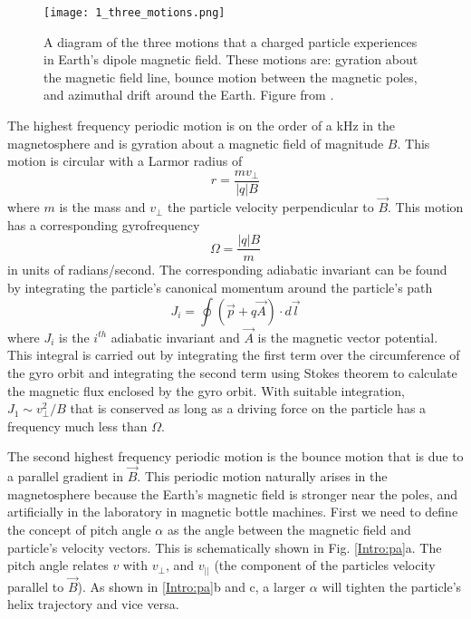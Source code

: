 \begin{figure}
\texttt{[image: 1\_three\_motions.png]}
\caption{A diagram of the three motions that a charged particle experiences in Earth's dipole magnetic field. These motions are: gyration about the magnetic field line, bounce motion between the magnetic poles, and azimuthal drift around the Earth. Figure from \citep{Baumjohann1997}.}
\label{Intro:motion_diagram}
\end{figure}


The highest frequency periodic motion is on the order of a kHz in the magnetosphere and is gyration about a magnetic field of magnitude $B$. This motion is circular with a Larmor radius of 
\begin{equation}
r = \frac{m v_\perp}{|q| B}
\end{equation} where $m$ is the mass and $v_\perp$ the particle velocity perpendicular to $\vec{B}$. This motion has a corresponding gyrofrequency 
\begin{equation}
\Omega = \frac{|q| B}{m}
\end{equation} in units of radians/second. The corresponding adiabatic invariant can be found by integrating the particle's canonical momentum around the particle's path
\begin{equation}
J_i = \oint (\vec{p} + q \vec{A}) \cdot d\vec{l}
\end{equation} where $J_i$ is the $i^{th}$ adiabatic invariant and $\vec{A}$ is the magnetic vector potential. This integral is carried out by integrating the first term over the circumference of the gyro orbit and integrating the second term using Stokes theorem to calculate the magnetic flux enclosed by the gyro orbit.  With suitable integration, $J_1 \sim v_\perp^2 / B$ that is conserved as long as a driving force on the particle has a frequency much less than $\Omega$.

The second highest frequency periodic motion is the bounce motion that is due to a parallel gradient in $\vec{B}$. This periodic motion naturally arises in the magnetosphere because the Earth's magnetic field is stronger near the poles, and artificially in the laboratory in magnetic bottle machines. First we need to define the concept of pitch angle $\alpha$ as the angle between the magnetic field and particle's velocity vectors. This is schematically shown in Fig. \ref{Intro:pa}a. The pitch angle relates $v$ with $v_\perp$, and $v_{||}$ (the component of the particles velocity parallel to $\vec{B}$). As shown in \ref{Intro:pa}b and c, a larger $\alpha$ will tighten the particle's helix trajectory and vice versa.

